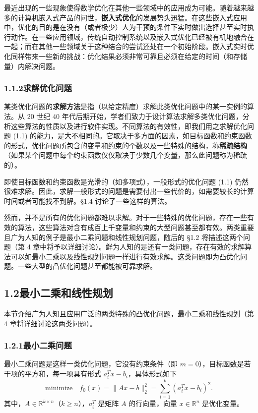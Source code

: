 \documentclass[UTF8, 12pt, fontset=fandol, oneside]{ctexart}
\begin{document}
最近出现的一些现象使得数学优化在其他一些领域中的应用成为可能。随着越来越多的计算机嵌入式产品的问世，\textbf{嵌入式优化}的发展势头迅猛。在这些嵌入式应用中，优化的目的是在没有（或者极少）人为干预的条件下实时做出选择甚至实时执行动作。在一些应用领域，传统自动控制系统以及嵌入式优化已经被有机地融合在一起；而在其他一些领域关于这种结合的尝试还处在一个初始阶段。嵌入式实时优化同样带来一些新的挑战：优化结果必须非常可靠且必须在给定的时间（和存储量）内解决问题。

\subsubsection*{1.1.2\quad 求解优化问题}

某类优化问题的\textbf{求解方法}是指（以给定精度）求解此类优化问题中的某一实例的算法。从 20 世纪 40 年代后期开始，学者们致力于设计算法求解多类优化问题，分析这些算法的性质以及进行软件实现。不同算法的有效性，即我们用之求解优化问题 (1.1) 的能力，是大不相同的。它取决于多方面的因素，如目标函数和约束函数的形式，优化问题所包含的变量和约束的个数以及一些特殊的结构，称\textbf{稀疏结构}（如果某个问题中每个约束函数仅仅取决于少数几个变量，那么此问题称为稀疏的）。

即使目标函数和约束函数是光滑的（如多项式），一般形式的优化问题 (1.1) 仍然很难求解。因此，求解一般形式的问题是需要付出一些代价的，如需要较长的计算时间或者可能找不到解。§1.4 讨论了一些这样的算法。

然而，并不是所有的优化问题都难以求解。对于一些特殊的优化问题，存在一些有效的算法，这些算法对含有成百上千变量和约束的大型问题甚至都有效。两类重要且广为人知的例子是最小二乘问题和线性规划问题，随后的 §1.2 将描述这两个问题（第 4 章中将予以详细讨论）。鲜为人知的是还有一类问题，存在有效的求解算法可以如最小二乘以及线性规划问题一样进行有效求解。这类问题即为凸优化问题。一些大型的凸优化问题甚至都能被可靠求解。

\subsection*{1.2\quad 最小二乘和线性规划}

本节介绍广为人知且应用广泛的两类特殊的凸优化问题，最小二乘和线性规划（第 4 章将详细讨论这两类问题）。

\subsubsection*{1.2.1\quad 最小二乘问题}

最小二乘问题是这样一类优化问题，它没有约束条件（即 $m=0$），目标函数是若干项的平方和，每一项具有形式 $a_i^Tx-b_i$，具体形式如下
\begin{equation}
  \text{minimize}\quad f_0(x)=\|Ax-b\|_2^2=\sum_{i=1}^k (a_i^Tx-b_i)^2.
\tag{1.4}
\end{equation}
其中，$A\in\mathbb{R}^{k\times n}$（$k\ge n$），$a_i^T$ 是矩阵 $A$ 的行向量，向量 $x\in\mathbb{R}^n$ 是优化变量。
\end{document}
